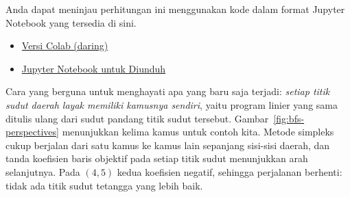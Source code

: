 \begin{resource}
Anda dapat meninjau perhitungan ini menggunakan kode dalam format Jupyter Notebook yang tersedia di sini.
\begin{itemize}
\item \href{https://colab.research.google.com/drive/1kUWeNOVZByIoSWWUEUEFwwdFhAQvGcsG?usp=sharing}{Versi Colab (daring)}
\item \href{https://github.com/open-optimization/open-optimization-or-examples/blob/master/linear-programming/Simplex_Tableaus_From_Basis.ipynb}{Jupyter Notebook untuk Diunduh}
\end{itemize}
\end{resource}

Cara yang berguna untuk menghayati apa yang baru saja terjadi: \emph{setiap titik sudut daerah layak memiliki kamusnya sendiri}, yaitu program linier yang sama ditulis ulang dari sudut pandang titik sudut tersebut. Gambar~\ref{fig:bfs-perspectives} menunjukkan kelima kamus untuk contoh kita. Metode simpleks cukup berjalan dari satu kamus ke kamus lain sepanjang sisi-sisi daerah, dan tanda koefisien baris objektif pada setiap titik sudut menunjukkan arah selanjutnya. Pada $(4,5)$ kedua koefisien negatif, sehingga perjalanan berhenti: tidak ada titik sudut tetangga yang lebih baik.

